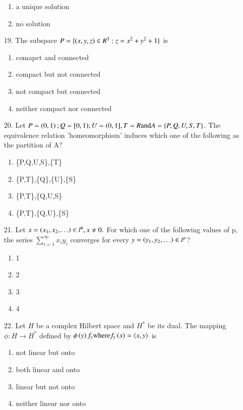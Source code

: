\documentclass[journal]{IEEEtran}
\begin{document}
\begin{enumerate}
\begin{enumerate}[label=(\Alph*)]
        \item a unique solution
        \item no solution
    \end{enumerate}
    \item[19.] The subspace $P = \{\left(x,y,z\right)\in R^3 : z = x^2 + y^2 + 1\}$ is 
    \begin{enumerate}[label=(\Alph*)]
        \item comapct and connected
        \item compact but not connected
        \item not compact but connected
        \item neither compact nor connected
    \end{enumerate}
    \item[20.] Let $P = \left(0,1\right); Q=[0,1); U = (0,1], T = R \text{and} A = \{P,Q,U,S,T\}$. The equivalence relation 'homeomorphism' induces which one of the following as the partition of A? 
    \begin{enumerate}[label=(\Alph*)]
        \item \{P,Q,U,S\},\{T\}
        \item \{P,T\},\{Q\},\{U\},\{S\}
        \item \{P,T\},\{Q,U,S\}
        \item \{P,T\},\{Q,U\},\{S\}
    \end{enumerate}
    \item[21.] Let $x =\left(x_1, x_2,\ldots\right)\in l^4, x\neq 0.$ For which one of the following values of p, the series $\sum_{i=1}^{\infty}x_iy_i$ converges for every $y=\left(y_1,y_2,\ldots\right)\in l^p$?
    \begin{enumerate}[label=(\Alph*)]
        \item 1
        \item 2
        \item 3
        \item 4
    \end{enumerate} 
    \item[22.] Let $H$ be a complex Hilbert space and $H^*$ be its dual. The mapping $\phi:H\rightarrow H^*$ defined by $\phi\left(y\right)f_y \text{where} f_y\left(x\right) = \langle x,y \rangle$ is  
    \begin{enumerate}[label=(\Alph*)]
        \item not linear but onto
        \item both linear and onto
        \item linear but not onto
        \item neither linear nor onto

\end{enumerate}
\end{enumerate}
\end{document}
